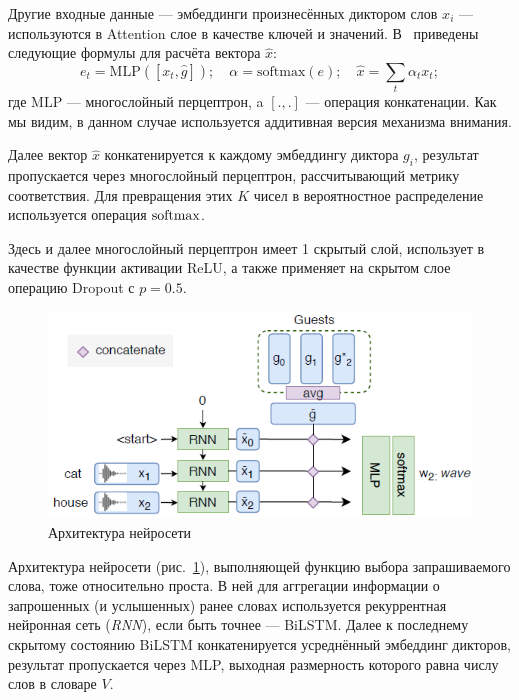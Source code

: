 Другие входные данные --- эмбеддинги произнесённых диктором слов $x_i$ ---
используются в Attention слое в качестве ключей и значений. В~\citeisr{}
приведены следующие формулы для расчёта вектора $\hat{x}$:
\begin{equation*}
    e_t = \text{MLP}([x_t, \hat{g}]); \quad \alpha = \text{softmax}(e); \quad
    \hat{x} = \sum_t{\alpha_t x_t};
\end{equation*}
где $\text{MLP}$ --- многослойный перцептрон, a $[.,.]$ --- операция
конкатенации. Как мы видим, в данном случае используется аддитивная версия
механизма внимания.

Далее вектор $\hat{x}$ конкатенируется к каждому эмбеддингу диктора $g_i$,
результат пропускается через многослойный перцептрон, рассчитывающий метрику
соответствия. Для превращения этих $K$ чисел в вероятностное распределение
используется операция $\operatorname{\text{softmax}}$.

Здесь и далее многослойный перцептрон имеет 1 скрытый слой, использует в
качестве функции активации ReLU, а также применяет на скрытом слое операцию
Dropout с $p=0.5$.

\begin{figure}[hbt]
    \centering
    \includegraphics[scale=1.0]{figures/enquirer.png}
    \caption{Архитектура нейросети \enquirer{}~\citeisr}
    \label{fig:enquirer}
\end{figure}

Архитектура нейросети \enquirer{} (рис.~\ref{fig:enquirer}), выполняющей
функцию выбора запрашиваемого слова, тоже относительно проста. В ней для
аггрегации информации о запрошенных (и услышенных) ранее словах используется
рекуррентная нейронная сеть (\textit{RNN}), если быть точнее --- BiLSTM\@.
Далее к последнему скрытому состоянию BiLSTM конкатенируется усреднённый
эмбеддинг дикторов, результат пропускается через MLP, выходная размерность
которого равна числу слов в словаре $V$.